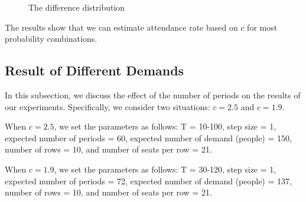 \begin{figure}[ht]
  \centering
  \caption{The difference distribution}
  \label{Fig}
\end{figure}

The results show that we can estimate attendance rate based on $c$ for most probability combinations. 

\subsection{Result of Different Demands}

In this subsection, we discuss the effect of the number of periods on the results of our experiments. Specifically, we consider two situations: $c = 2.5$ and $c = 1.9$.

When $c = 2.5$, we set the parameters as follows: T = 10-100, step size = 1, expected number of periods = 60, expected number of demand (people) = 150, number of rows = 10, and number of seats per row = 21.

When $c = 1.9$, we set the parameters as follows: T = 30-120, step size = 1, expected number of periods = 72, expected number of demand (people) = 137, number of rows = 10, and number of seats per row = 21.

